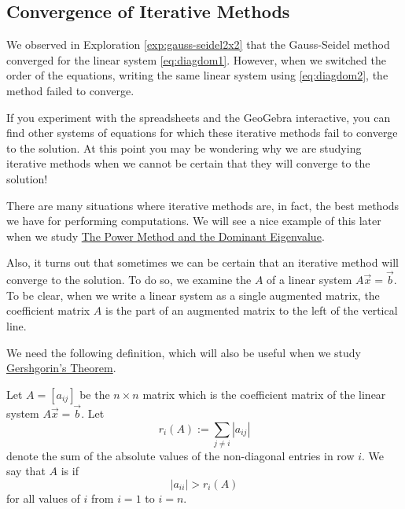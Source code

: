 \documentclass{ximera}
\begin{document}
\subsection*{Convergence of Iterative Methods}

We observed in Exploration \ref{exp:gauss-seidel2x2} that the Gauss-Seidel method converged for the linear system \ref{eq:diagdom1}.  However, when we switched the order of the equations, writing the same linear system using \ref{eq:diagdom2}, the method failed to converge.  

If you experiment with the spreadsheets and the GeoGebra interactive, you can find other systems of equations for which these iterative methods fail to converge to the solution.  At this point you may be wondering why we are studying iterative methods when we cannot be certain that they will converge to the solution!  

There are many situations where iterative methods are, in fact, the best methods we have for performing computations.  We will see a nice example of this later when we study \href{https://ximera.osu.edu/oerlinalg/LinearAlgebra/EIG-0070/main}{The Power Method and the Dominant Eigenvalue}.

Also, it turns out that sometimes we can be certain that an iterative method will converge to the solution.  To do so, we examine the  $A$ of a linear system $A \vec{x}= \vec{b}$.  To be clear, when we write a linear system as a single augmented matrix, the coefficient matrix $A$ is the part of an augmented matrix to the left of the vertical line.

We need the following definition, which will also be useful when we study \href{https://ximera.osu.edu/oerlinalg/LinearAlgebra/EIG-0080/main}{Gershgorin's Theorem}.

\begin{definition}\label{def:strict_diag_dom}
Let $A=[a_{ij}]$ be the $n\times n$ matrix which is the coefficient matrix of the linear system $A \vec{x}= \vec{b}$.  Let
$$
r_i(A):= \sum_{j \ne i} |a_{ij}|
$$
denote the sum of the absolute values of the non-diagonal entries in row $i$.  We say that $A$ is  if 
$$|a_{ii}|>r_i(A)$$
for all values of $i$ from $i=1$ to $i=n$.
\end{definition}
\end{document}
